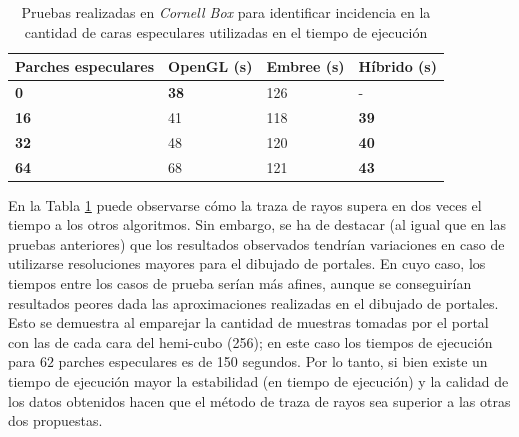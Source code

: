 \begin{table}[htbp]
	\centering
	\caption{Pruebas realizadas en \textit{Cornell Box} para identificar incidencia en la cantidad de caras especulares utilizadas en el tiempo de ejecución}
\begin{tabular}{|l|l|l|l|}
	\hline
	\multicolumn{1}{|c|}{\textbf{Parches especulares}} & \multicolumn{1}{c|}{OpenGL (s)} & \multicolumn{1}{c|}{Embree (s)} & \multicolumn{1}{c|}{Híbrido (s)} \\ \hline
	\textbf{0}                              & \textbf{38}                          & 126                         & -                            \\ \hline
	\textbf{16}                             & 41                          & 118                         & \textbf{39}                           \\ \hline
	\textbf{32}                             & 48                          & 120                         & \textbf{40}                           \\ \hline
	\textbf{64}                             & 68                          & 121                         & \textbf{43}                           \\ \hline
\end{tabular}
	\label{tab:caso3}
\end{table}

En la Tabla \ref{tab:caso3} puede observarse cómo la traza de rayos supera en dos veces el tiempo a los otros algoritmos. Sin embargo, se ha de destacar (al igual que en las pruebas anteriores) que los resultados observados tendrían variaciones en caso de utilizarse resoluciones mayores para el dibujado de portales. En cuyo caso, los tiempos entre los casos de prueba serían más afines, aunque se conseguirían resultados peores dada las aproximaciones realizadas en el dibujado de portales. Esto se demuestra al emparejar la cantidad de muestras tomadas por el portal con las de cada cara del hemi-cubo (256); en este caso los tiempos de ejecución para $62$ parches especulares es de 150 segundos. Por lo tanto, si bien existe un tiempo de ejecución mayor la estabilidad (en tiempo de ejecución) y la calidad de los datos obtenidos hacen que el método de traza de rayos sea superior a las otras dos propuestas.

